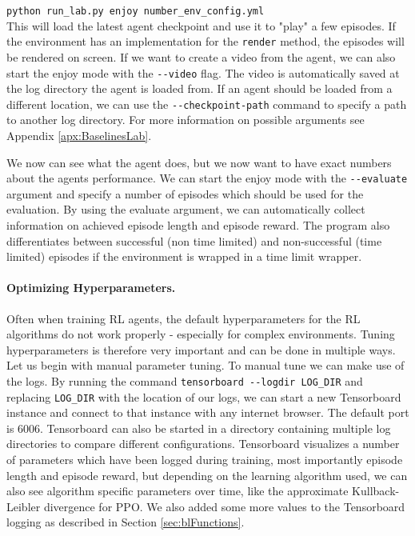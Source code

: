 \texttt{python run\_lab.py enjoy number\_env\_config.yml} \\

\noindent This will load the latest agent checkpoint and use it to "play" a few episodes. If the environment has an implementation for the \texttt{render} method, the episodes will be rendered on screen. If we want to create a video from the agent, we can also start the enjoy mode with the \texttt{-{}-video} flag. The video is automatically saved at the log directory the agent is loaded from. If an agent should be loaded from a different location, we can use the \texttt{-{}-checkpoint-path} command to specify a path to another log directory. For more information on possible arguments see Appendix \ref{apx:BaselinesLab}. 

We now can see what the agent does, but we now want to have exact numbers about the agents performance. We can start the enjoy mode with the \texttt{-{}-evaluate} argument and specify a number of episodes which should be used for the evaluation. By using the evaluate argument, we can automatically collect information on achieved episode length and episode reward. The program also differentiates between successful (non time limited) and non-successful (time limited) episodes if the environment is wrapped in a time limit wrapper.

\paragraph{Optimizing Hyperparameters.}
Often when training RL agents, the default hyperparameters for the RL algorithms do not work properly - especially for complex environments. Tuning hyperparameters is therefore very important and can be done in multiple ways. Let us begin with manual parameter tuning. To manual tune we can make use of the logs. By running the command \texttt{tensorboard -{}-logdir LOG\_DIR} and replacing \texttt{LOG\_DIR} with the location of our logs, we can start a new Tensorboard instance and connect to that instance with any internet browser. The default port is 6006. Tensorboard can also be started in a directory containing multiple log directories to compare different configurations. Tensorboard visualizes a number of parameters which have been logged during training, most importantly episode length and episode reward, but depending on the learning algorithm used, we can also see algorithm specific parameters over time, like the approximate Kullback-Leibler divergence for PPO. We also added some more values to the Tensorboard logging as described in Section \ref{sec:blFunctions}.  

